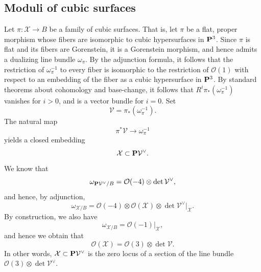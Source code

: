 \documentclass[reqno]{amsart}
\renewcommand{\to}{{\longrightarrow}}
\renewcommand {\P}{{\bf P}}
\numberwithin{equation}{section}
\renewcommand{\O}{\mathcal{O}}
\newcommand{\cX}{\mathcal{X}}
\begin{document}
\subsection{Moduli of cubic surfaces}
\label{sec:classical-facts}
Let $\pi \colon \cX \to B$ be a family of cubic surfaces.  That is,
let $\pi$ be a flat, proper morphism whose fibers are isomorphic to
cubic hypersurfaces in $\P^3$.  Since $\pi$ is flat and its fibers are
Gorenstein, it is a Gorenstein morphism, and hence admits a dualizing
line bundle $\omega_{\pi}$.  By the adjunction formula, it follows that
the restriction of $\omega_{\pi}^{-1}$ to every fiber is isomorphic to
the restriction of $\O(1)$ with respect to an embedding of the fiber
as a cubic hypersurface in $\P^3$.  By standard theorems about
cohomology and base-change, it follows that
$R^i\pi_* \left(\omega_{\pi}^{-1}\right)$ vanishes for $i > 0$, and is
a vector bundle for $i = 0$.  Set
\[ \mathcal{V} = \pi_* \left( \omega_{\pi}^{-1} \right).\]
The natural map
\[ \pi^*\mathcal{V} \to \omega_{\pi}^{-1}\]
yields a closed embedding
\begin{equation}\label{eqn:relcanx}
  \cX \subset \P \mathcal{V}^{\vee}.
\end{equation}
We know that
\[ \omega_{\P \mathcal{V}^{\vee}/B} = \O(-4) \otimes \det \mathcal{V}^{\vee},\]
and hence, by adjunction,
\[ \omega_{\cX/B}= \O(-4) \otimes \O(\cX) \otimes \det \mathcal{V}^{\vee} |_{\cX}.\]
By construction, we also have
\[ \omega_{\cX/B} = \O(-1)|_{\cX},\]
and hence we obtain that
\begin{equation}\label{eqn:ox}
  \O(\cX) = \O(3) \otimes \det \mathcal{V}.
\end{equation}
In other words, $\cX \subset \P \mathcal{V}^{\vee}$ is the zero locus of
a section of the line bundle $\O(3) \otimes \det \mathcal{V}^{\vee}$.
\end{document}
